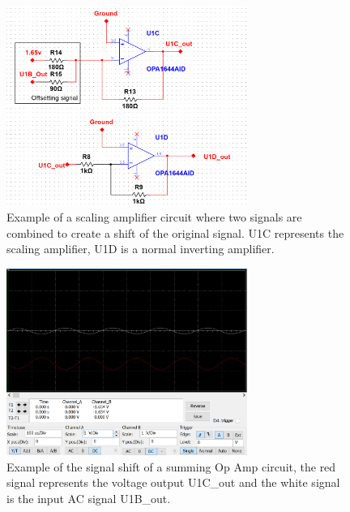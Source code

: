 \begin{figure}[h]
    \centering
    \includegraphics[width=0.70\textwidth]{graphics/sumCircuitexamp.png}
    \caption{Example of a scaling amplifier circuit where two signals are combined to create a shift of the original signal. U1C represents the scaling amplifier, U1D is a normal inverting amplifier.}
    \label{fig:sumCircuitexamp}
\end{figure}

\begin{figure}[h]
    \centering
    \includegraphics[width=0.70\textwidth]{graphics/summingShift.png}
    \caption{Example of the signal shift of a summing Op Amp circuit, the red signal represents the voltage output U1C\_out and the white signal is the input AC signal U1B\_out.}
    \label{fig:SummingOpAmpShift}
\end{figure}

